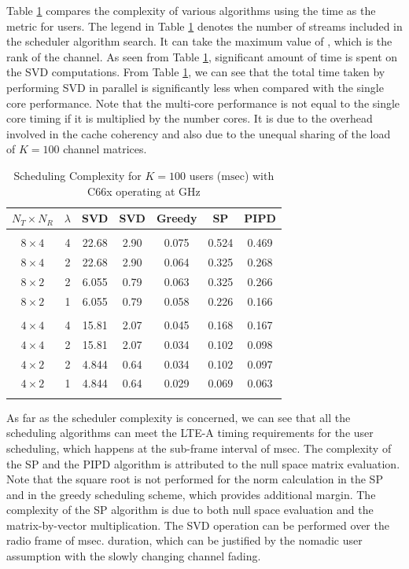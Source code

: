 \documentclass[conference,letterpaper]{./../../IEEE/IEEEtran}
\begin{document}
Table \ref{table:compexity_comparison} compares the complexity of various algorithms using the time as the metric for  users. The legend \me{\lambda} in Table \ref{table:compexity_comparison} denotes the number of streams included in the scheduler algorithm search. It can take the maximum value of \me{\kappa}, which is the rank of the channel. As seen from Table \ref{table:compexity_comparison}, significant amount of time is spent on the SVD computations. From Table \ref{table:compexity_comparison}, we can see that the total time taken by performing SVD in parallel is significantly less when compared with the single core performance. Note that the multi-core performance is not equal to the single core timing if it is multiplied by the number cores. It is due to the overhead involved in the cache coherency and also due to the unequal sharing of the load of $K = 100$ channel matrices.
\begin{table} \caption{Scheduling Complexity for $K = 100$ users ($\mathrm{msec}$) with C66x operating at GHz} \begin{center} \begin{tabular}{c c c c c c c}
			$N_T \times N_R $ & $\lambda$ & SVD \eqn{(1)} & SVD \eqn{(8)} & Greedy   & SP          & PIPD \\ 
			\hline \\
			$8 \times 4$ & 4 & 22.68 & 2.90 & 0.075 & 0.524 & 0.469 \\ 
			$8 \times 4$ & 2 & 22.68 & 2.90 & 0.064 & 0.325 & 0.268 \\
			$8 \times 2$ & 2 & 6.055 & 0.79 & 0.063 & 0.325 & 0.266 \\
			$8 \times 2$ & 1 & 6.055 & 0.79 & 0.058 & 0.226 & 0.166 \\
			\hline \\
			$4 \times 4$ & 4 & 15.81 & 2.07 & 0.045 & 0.168 & 0.167 \\ 
			$4 \times 4$ & 2 & 15.81 & 2.07 & 0.034 & 0.102 & 0.098 \\
			$4 \times 2$ & 2 & 4.844 & 0.64 & 0.034 & 0.102 & 0.097 \\
			$4 \times 2$ & 1 & 4.844 & 0.64 & 0.029 & 0.069 & 0.063 \\
			\hline \vspace{-0.3in}
		\end{tabular} \label{table:compexity_comparison}\end{center}
\end{table}

As far as the scheduler complexity is concerned, we can see that all the scheduling algorithms can meet the LTE-A timing requirements for the user scheduling, which happens at the sub-frame interval of  msec. The complexity of the SP and the PIPD algorithm is attributed to the null space matrix evaluation. Note that the square root is not performed for the norm calculation in the SP and in the greedy scheduling scheme, which provides additional margin. The complexity of the SP algorithm is due to both null space evaluation and the matrix-by-vector multiplication. The SVD operation can be performed over the radio frame of  msec. duration, which can be justified by the nomadic user assumption with the slowly changing channel fading.
\end{document}
